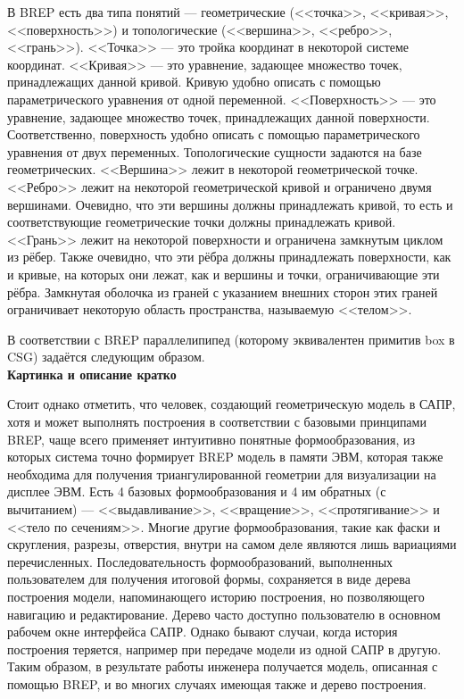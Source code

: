 В BREP есть два типа понятий --- геометрические (<<точка>>, <<кривая>>, <<поверхность>>) и топологические (<<вершина>>, <<ребро>>, <<грань>>). <<Точка>> --- это тройка координат в некоторой системе координат. <<Кривая>> --- это уравнение, задающее множество точек, принадлежащих данной кривой. Кривую удобно описать с помощью параметрического уравнения от одной переменной. <<Поверхность>> --- это уравнение, задающее множество точек, принадлежащих данной поверхности. Соответственно, поверхность удобно описать с помощью параметрического уравнения от двух переменных. Топологические сущности задаются на базе геометрических. <<Вершина>> лежит в некоторой геометрической точке. <<Ребро>> лежит на некоторой геометрической кривой и ограничено двумя вершинами. Очевидно, что эти вершины должны принадлежать кривой, то есть и соответствующие геометрические точки должны принадлежать кривой. <<Грань>> лежит на некоторой поверхности и ограничена замкнутым циклом из рёбер. Также очевидно, что эти рёбра должны принадлежать поверхности, как и кривые, на которых они лежат, как и вершины и точки, ограничивающие эти рёбра. Замкнутая оболочка из граней с указанием внешних сторон этих граней ограничивает некоторую область пространства, называемую <<телом>>.

В соответствии с BREP параллелипипед (которому эквивалентен примитив box в CSG) задаётся следующим образом.\\
\textbf{Картинка и описание кратко}

Стоит однако отметить, что человек, создающий геометрическую модель в САПР, хотя и может выполнять построения в соответствии с базовыми принципами BREP, чаще всего применяет интуитивно понятные формообразования, из которых система точно формирует BREP модель в памяти ЭВМ, которая также необходима для получения триангулированной геометрии для визуализации на дисплее ЭВМ. Есть 4 базовых формообразования и 4 им обратных (с вычитанием) --- <<выдавливание>>, <<вращение>>, <<протягивание>> и <<тело по сечениям>>. Многие другие формообразования, такие как фаски и скругления, разрезы, отверстия, внутри на самом деле являются лишь вариациями перечисленных. Последовательность формообразований, выполненных пользователем для получения итоговой формы, сохраняется в виде дерева построения модели, напоминающего историю построения, но позволяющего навигацию и редактирование. Дерево часто доступно пользователю в основном рабочем окне интерфейса САПР. Однако бывают случаи, когда история построения теряется, например при передаче модели из одной САПР в другую. Таким образом, в результате работы инженера получается модель, описанная с помощью BREP, и во многих случаях имеющая также и дерево построения.


